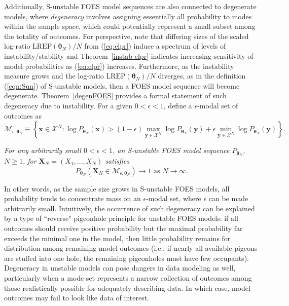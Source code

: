 \documentclass[12pt]{article}
\theoremstyle{definition}
\newcommand{\REP}{\mathrm{LREP}}
\begin{document}
Additionally, S-unstable FOES model sequences are also connected to degenerate models, where {\it degeneracy} involves assigning essentially all probability   to modes within the sample space, which could potentially represent a  small subset among the totality of outcomes.  For perspective, note that differing sizes of the scaled log-ratio $\REP(\boldsymbol \theta_N)/N$ from (\ref{eq:elpr}) induce a spectrum of levels of instability/stability and Theorem~\ref{instab-elpr} indicates increasing sensitivity of model probabilities as (\ref{eq:elpr}) increases.  Furthermore, as the instability measure grows and the log-ratio $\REP(\boldsymbol \theta_N)/N$ diverges, as in the definition (\ref{eqn:Sun}) of S-unstable models, then a FOES model sequence  will become degenerate.
 Theorem~\ref{degenFOES} provides a formal statement of such degeneracy due to instability. For a given $0 < \epsilon < 1$, define a $\epsilon$-modal set of   outcomes as
\begin{equation}
\label{eqn:mode}
\mathcal{M}_{\epsilon, \boldsymbol \theta_N} \equiv \left\{\boldsymbol x \in \mathcal{X}^N: \log P_{\boldsymbol \theta_N}(\boldsymbol x) > (1-\epsilon)\max\limits_{\boldsymbol y \in \mathcal{X}^N} \log  P_{\boldsymbol \theta_N}(\boldsymbol y) + \epsilon\min\limits_{\boldsymbol y \in \mathcal{X}^N} \log P_{\boldsymbol \theta_N}(\boldsymbol y) \right\}.
\end{equation}


\begin{theorem1}
\label{degenFOES} {\it For any arbitrarily small  $0 < \epsilon < 1$,  an S-unstable FOES model sequence $P_{\boldsymbol \theta_N}$, $N \geq 1$, for $\boldsymbol X_N=(X_1, \dots, X_N)$ satisfies
$$
P_{\boldsymbol \theta_N}\left( \boldsymbol X_N\in \mathcal{M}_{\epsilon, \boldsymbol \theta_N}\right) \rightarrow 1 \text{ as } N \rightarrow \infty.
$$}
\end{theorem1}

In other words, as the sample size grows in S-unstable FOES models, all probability   tends to concentrate mass on an $\epsilon$-modal set, where $\epsilon$ can be made arbitrarily small.  Intuitively, the occurrence of such degeneracy can be explained
by a type of ``reverse" pigeonhole principle for unstable FOES models: if all outcomes should receive positive probability but the maximal  probability far exceeds the minimal one in the model, then little probability remains for distribution among remaining model   outcomes (i.e., if nearly all available pigeons are stuffed into one hole, the remaining  pigeonholes must have few occupants).  Degeneracy in unstable models can pose dangers in data modeling as well, particularly when a mode set  represents a  narrow collection of outcomes among those  realistically  possible for adequately describing data. In which case, model outcomes may fail to look like data of interest.
\end{document}
